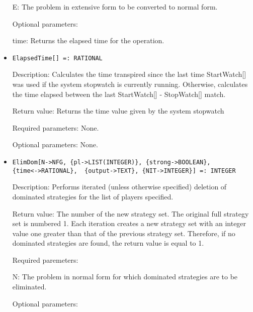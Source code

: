 \begin{itemize}
\bd
\item
[E:] The problem in extensive form to be converted to normal form.
\ed

\item
[Optional parameters:]\hfil\null
	
\bd
\item
[time:] Returns the elapsed time for the operation.
\ed
\ed

\item

\protect \large \begin{verbatim}
ElapsedTime[] =: RATIONAL
\end{verbatim}\normalsize

\bd
\item
[Description:] Calculates the time transpired since the last time
StartWatch[] was used if the system stopwatch is currently running.
Otherwise, calculates the time elapsed between the last StartWatch[] -
StopWatch[] match.
\item
[Return value:] Returns the time value given by the system stopwatch
\item
[Required parameters:] None.
\item   
[Optional parameters:] None.
\ed

\item
\protect \large \begin{verbatim}
ElimDom[N->NFG, {pl->LIST(INTEGER)}, {strong->BOOLEAN},
{time<->RATIONAL}, 	{output->TEXT}, {NIT->INTEGER}] =: INTEGER
\end{verbatim} \normalsize

\bd
\item
[Description:] Performs iterated (unless otherwise specified) deletion
of dominated strategies for the list of players specified.
\item  
[Return value:] The number of the new strategy set.  The original full
strategy set is numbered 1.  Each iteration creates a new strategy set
with an integer value one greater than that of the previous strategy
set.  Therefore, if no dominated strategies are found, the return
value is equal to 1.
\item
[Required paremeters:]\hfil\null
	
\bd
\item
[N:] The problem in normal form for which dominated strategies are to
be eliminated.
\ed

\item
[Optional parameters:]\hfil\null


\end{itemize}

